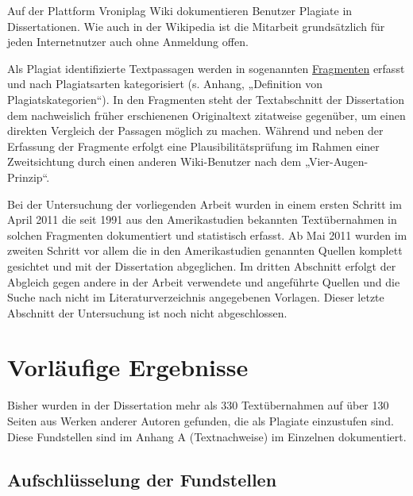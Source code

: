 \documentclass[ngerman,final,fontsize=12pt,paper=a4,twoside,bibliography=totoc,BCOR=8mm,draft=false]{scrartcl}
\begin{document}
Auf der Plattform Vroniplag Wiki dokumentieren Benutzer Plagiate in Dissertationen. Wie auch in der Wikipedia ist die Mitarbeit grundsätzlich für jeden Internetnutzer auch ohne Anmeldung offen. 


Als Plagiat identifizierte Textpassagen werden in sogenannten %
\href{http://de.vroniplag.wikia.com/wiki/Skm/Fragmente}{Fragmenten} erfasst und nach Plagiatsarten kategorisiert (s. Anhang, „Definition von Plagiatskategorien“). In den Fragmenten steht der Textabschnitt der Dissertation dem nachweislich früher erschienenen Originaltext zitatweise gegenüber, um einen direkten Vergleich der Passagen möglich zu machen. Während und neben der Erfassung der Fragmente erfolgt eine Plausibilitätsprüfung im Rahmen einer Zweitsichtung durch einen anderen Wiki-Benutzer nach dem „Vier-Augen-Prinzip“. 


Bei der Untersuchung der vorliegenden Arbeit wurden in einem ersten Schritt im April 2011 die seit 1991 aus den Amerikastudien bekannten Textübernahmen in solchen Fragmenten dokumentiert und statistisch erfasst. Ab Mai 2011 wurden im zweiten Schritt vor allem die in den Amerikastudien genannten Quellen komplett gesichtet und mit der Dissertation abgeglichen. Im dritten Abschnitt erfolgt der Abgleich gegen andere in der Arbeit verwendete und angeführte Quellen und die Suche nach nicht im Literaturverzeichnis angegebenen Vorlagen. Dieser letzte Abschnitt der Untersuchung ist noch nicht abgeschlossen. 

\section{%
Vorläufige Ergebnisse}

Bisher wurden in der Dissertation mehr als 330 Textübernahmen auf über 130 Seiten aus Werken anderer Autoren gefunden, die als Plagiate einzustufen sind. Diese Fundstellen sind im Anhang A (Textnachweise) im Einzelnen dokumentiert. 

\subsection{%
 Aufschlüsselung der Fundstellen }
\end{document}
